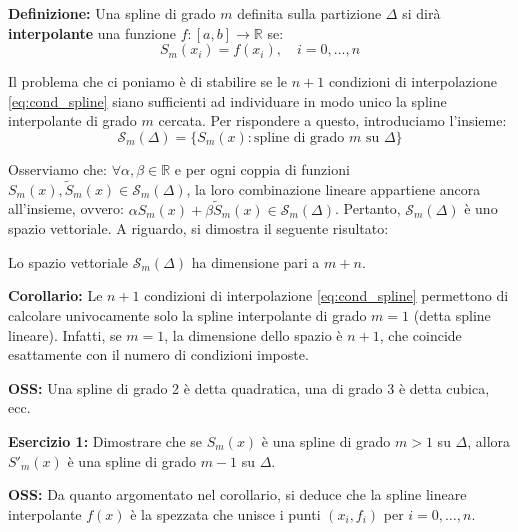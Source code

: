 \textbf{Definizione:} Una spline di grado $m$ definita sulla partizione $\Delta$ si dirà \textbf{interpolante} una funzione $f:[a,b] \rightarrow \mathbb{R}$ se:
\begin{equation} \label{eq:cond_spline}
S_m(x_i) = f(x_i), \quad i=0, \dots, n
\end{equation}

Il problema che ci poniamo è di stabilire se le $n+1$ condizioni di interpolazione \eqref{eq:cond_spline} siano sufficienti ad individuare in modo unico la spline interpolante di grado $m$ cercata.
Per rispondere a questo, introduciamo l'insieme:
\begin{equation}
\mathcal{S}_m(\Delta) = \{S_m(x) : \text{spline di grado } m \text{ su } \Delta \}
\end{equation}

Osserviamo che: $\forall \alpha, \beta \in \mathbb{R}$ e per ogni coppia di funzioni $S_m(x), \tilde{S}_m(x) \in \mathcal{S}_m(\Delta)$, la loro combinazione lineare appartiene ancora all'insieme, ovvero: $\alpha S_m(x) + \beta \tilde{S}_m(x) \in \mathcal{S}_m(\Delta)$.
Pertanto, $\mathcal{S}_m(\Delta)$ è uno spazio vettoriale. A riguardo, si dimostra il seguente risultato:

\begin{teorema}
Lo spazio vettoriale $\mathcal{S}_m(\Delta)$ ha dimensione pari a $m+n$.
\end{teorema}

\textbf{Corollario:} Le $n+1$ condizioni di interpolazione \eqref{eq:cond_spline} permettono di calcolare univocamente solo la spline interpolante di grado $m=1$ (detta spline lineare). Infatti, se $m=1$, la dimensione dello spazio è $n+1$, che coincide esattamente con il numero di condizioni imposte.

\textbf{OSS:} Una spline di grado 2 è detta quadratica, una di grado 3 è detta cubica, ecc.

\vspace{1cm}
\textbf{Esercizio 1:} Dimostrare che se $S_m(x)$ è una spline di grado $m > 1$ su $\Delta$, allora $S'_m(x)$ è una spline di grado $m-1$ su $\Delta$.

\vspace{0.3cm}
\textbf{OSS:}
Da quanto argomentato nel corollario, si deduce che la spline lineare interpolante $f(x)$ è la spezzata che unisce i punti $(x_i, f_i)$ per $i=0, \dots, n$.

